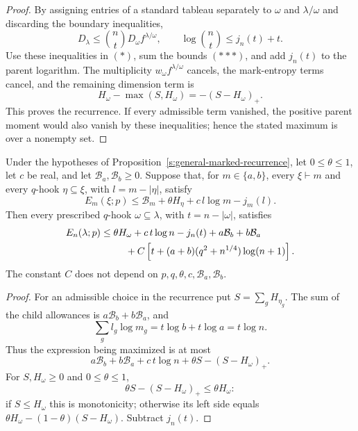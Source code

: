 \begin{proof}
By assigning entries of a standard tableau separately to $\omega$ and
$\lambda/\omega$ and discarding the boundary inequalities,
\[
 D_\lambda\le\binom ntD_\omega f^{\lambda/\omega},
 \qquad \log\binom nt\le j_n(t)+t.
\]
Use these inequalities in $(\ast)$, sum the bounds $(\ast\ast\ast)$,
and add $j_n(t)$ to the parent logarithm.  The multiplicity
$w_\omega f^{\lambda/\omega}$ cancels, the mark-entropy terms cancel,
and the remaining dimension term is
\[
 H_\omega-\max(S,H_\omega)=-(S-H_\omega)_+.
\]
This proves the recurrence.  If every admissible term vanished, the
positive parent moment would also vanish by these inequalities; hence
the stated maximum is over a nonempty set.
\end{proof}

\begin{corollary}
\label{s:inverse-budget-specialization}
Under the hypotheses of Proposition~\ref{s:general-marked-recurrence},
let $0\le\theta\le1$, let $c$ be real, and let $\mathcal B_a,\mathcal B_b\ge0$.
Suppose that, for $m\in\{a,b\}$, every $\xi\vdash m$ and every
$q$-hook $\eta\subseteq\xi$, with $l=m-|\eta|$, satisfy
\begin{equation}
 E_m(\xi;p)\le \mathcal B_m+\theta H_\eta+c\,l\log m-j_m(l).
 \label{s:eq:inverse-child-budget}
\end{equation}
Then every prescribed $q$-hook $\omega\subseteq\lambda$, with
$t=n-|\omega|$, satisfies
\begin{align}
 E_n(\lambda;p)
 &\le\theta H_\omega+c\,t\log n-j_n(t)+a\mathcal B_b+b\mathcal B_a\notag\\
 &\hspace{9mm}+C\left[t+(a+b)(q^2+n^{1/4})\log(n+1)\right].
 \label{s:eq:inverse-budget-specialization}
\end{align}
The constant $C$ does not depend on $p,q,\theta,c,\mathcal B_a,\mathcal B_b$.
\end{corollary}
\begin{proof}
For an admissible choice in the recurrence put $S=\sum_g H_{\eta_g}$.
The sum of the child allowances is $a\mathcal B_b+b\mathcal B_a$, and
\[
 \sum_g l_g\log m_g=t\log b+t\log a=t\log n.
\]
Thus the expression being maximized is at most
\[
 a\mathcal B_b+b\mathcal B_a+c\,t\log n+\theta S-(S-H_\omega)_+.
\]
For $S,H_\omega\ge0$ and $0\le\theta\le1$,
\[
 \theta S-(S-H_\omega)_+\le\theta H_\omega:
\]
if $S\le H_\omega$ this is monotonicity; otherwise its left side equals
$\theta H_\omega-(1-\theta)(S-H_\omega)$.  Subtract $j_n(t)$.
\end{proof}

